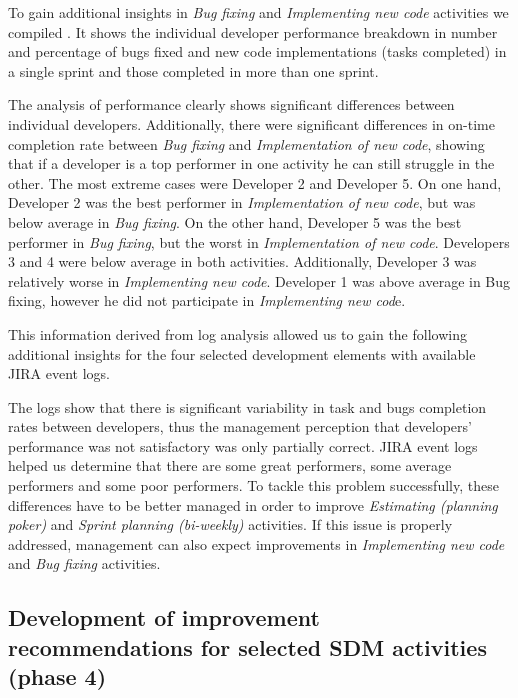 To gain additional insights in \emph{Bug fixing} and \emph{Implementing new code} activities we compiled . It shows the individual developer performance breakdown in number and percentage of bugs fixed and new code implementations (tasks completed) in a single sprint and those completed in more than one sprint. 



The analysis of performance clearly shows significant differences between individual developers. Additionally, there were significant differences in on-time completion rate between \emph{Bug fixing} and\emph{ Implementation of new code}, showing that if a developer is a top performer in one activity he can still struggle in the other. The most extreme cases were Developer 2 and Developer 5. On one hand, Developer 2 was the best performer in \emph{Implementation of new code}, but was below average in \emph{Bug fixing}. On the other hand, Developer 5 was the best performer in \emph{Bug fixing}, but the worst in \emph{Implementation of new code}. Developers 3 and 4 were below average in both activities. Additionally, Developer 3 was relatively worse in \emph{Implementing new code}. Developer 1 was above average in Bug fixing, however he did not participate in \emph{Implementing new cod}e.

This information derived from log analysis allowed us to gain the following additional insights for the four selected development elements with available JIRA event logs.

The logs show that there is significant variability in task and bugs completion rates between developers, thus the management perception that developers’ performance was not satisfactory was only partially correct. JIRA event logs helped us determine that there are some great performers, some average performers and some poor performers.  To tackle this problem successfully, these differences have to be better managed in order to improve \emph{Estimating (planning poker)} and \emph{Sprint planning (bi-weekly)} activities. If this issue is properly addressed, management can also expect improvements in \emph{Implementing new code} and \emph{Bug fixing} activities.

\subsection{Development of improvement recommendations for selected SDM activities (phase 4)}

